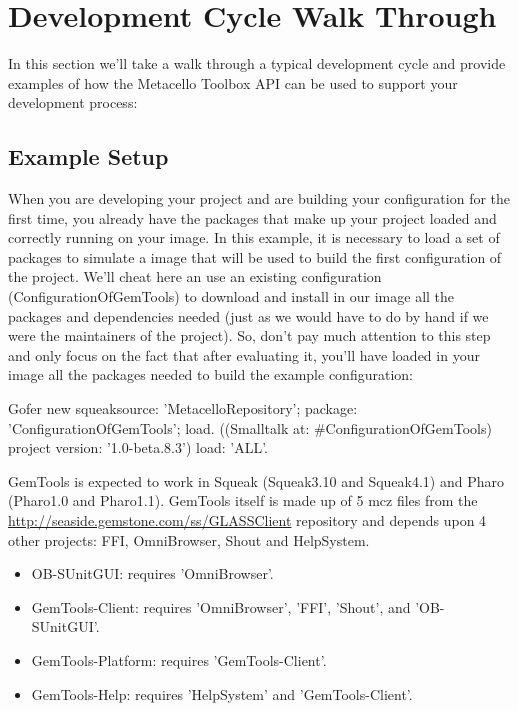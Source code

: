 \documentclass[a4paper,10pt,twoside]{book}
\begin{document}
\section{Development Cycle Walk Through}

In this section we'll take a walk through a typical development cycle and provide examples of how the Metacello Toolbox API can be used to support your development process:

\subsection{Example Setup}

When you are developing your project and are building your configuration for the first time, you already have the packages that make up your project loaded and correctly running on your image. In this example, it is necessary to load a set of packages to simulate a image that will be used to build the first configuration of the project. We'll cheat here an use an existing configuration (ConfigurationOfGemTools) to download and install in our image all the packages and dependencies needed (just as we would have to do by hand if we were the maintainers of the project). So, don't pay much attention to this step and only focus on the fact that after evaluating it, you'll have loaded in your image all the packages needed to build the example configuration:

\begin{code}{}
Gofer new
  squeaksource: 'MetacelloRepository';
  package: 'ConfigurationOfGemTools';
  load.
((Smalltalk at: #ConfigurationOfGemTools) project version: '1.0-beta.8.3')
  load: 'ALL'.
\end{code}

GemTools is expected to work in Squeak (Squeak3.10 and Squeak4.1) and Pharo (Pharo1.0 and Pharo1.1). GemTools itself is made up of 5 mcz files from the \url{http://seaside.gemstone.com/ss/GLASSClient} repository and  depends upon 4 other projects: FFI, OmniBrowser, Shout and HelpSystem. 
\begin{itemize}
\item OB-SUnitGUI: requires 'OmniBrowser'. 
\item GemTools-Client: requires 'OmniBrowser', 'FFI', 'Shout', and 'OB-SUnitGUI'. 
\item GemTools-Platform: requires 'GemTools-Client'. 
\item GemTools-Help: requires 'HelpSystem' and 'GemTools-Client'. 
\end{itemize}
\end{document}

